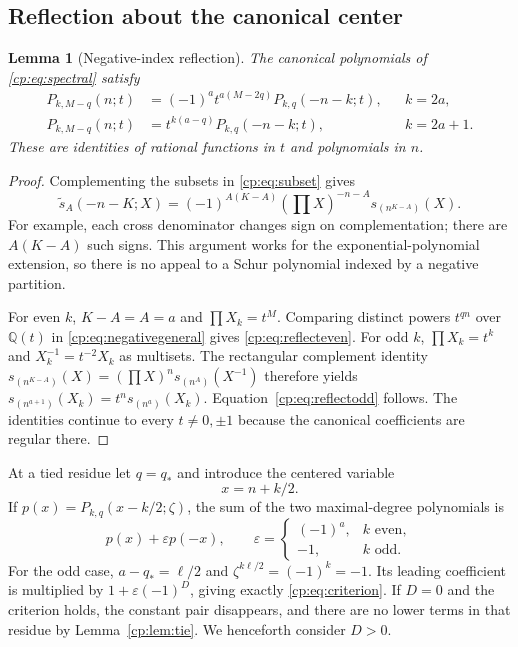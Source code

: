 \documentclass[11pt]{article}
\newtheorem{lemma}[theorem]{Lemma}
\theoremstyle{definition}
\theoremstyle{remark}
\newcommand{\Q}{\mathbb Q}
\theoremstyle{definition}
\theoremstyle{plain}
\numberwithin{equation}{section}
\begin{document}
\subsection{Reflection about the canonical center}
\begin{lemma}[Negative-index reflection]
\label{cp:lem:reflection}
The canonical polynomials of \eqref{cp:eq:spectral} satisfy
\begin{align}
 P_{k,M-q}(n;t)&=(-1)^a t^{a(M-2q)}P_{k,q}(-n-k;t),&&k=2a,
 \label{cp:eq:reflecteven}\\
 P_{k,M-q}(n;t)&=t^{k(a-q)}P_{k,q}(-n-k;t),&&k=2a+1.
 \label{cp:eq:reflectodd}
\end{align}
These are identities of rational functions in $t$ and polynomials in $n$.
\end{lemma}
\begin{proof}
Complementing the subsets in \eqref{cp:eq:subset} gives
\begin{equation}
 \widetilde s_A(-n-K;X)=(-1)^{A(K-A)}
 (\prod X)^{-n-A}s_{(n^{K-A})}(X).
 \label{cp:eq:negativegeneral}
\end{equation}
For example, each cross denominator changes sign on complementation;
there are $A(K-A)$ such signs. This argument works for the
exponential-polynomial extension, so there is no appeal to a Schur
polynomial indexed by a negative partition.

For even $k$, $K-A=A=a$ and $\prod X_k=t^M$. Comparing distinct
powers $t^{qn}$ over $\Q(t)$ in \eqref{cp:eq:negativegeneral} gives
\eqref{cp:eq:reflecteven}. For odd $k$, $\prod X_k=t^k$ and
$X_k^{-1}=t^{-2}X_k$ as multisets. The rectangular complement identity
$s_{(n^{K-A})}(X)=(\prod X)^n s_{(n^A)}(X^{-1})$ therefore yields
$s_{(n^{a+1})}(X_k)=t^n s_{(n^a)}(X_k)$.
Equation~\eqref{cp:eq:reflectodd} follows. The identities continue to every
$t\ne0,\pm1$ because the canonical coefficients are regular there.
\end{proof}

At a tied residue let $q=q_*$ and introduce the centered variable
\begin{equation}x=n+k/2.\label{cp:eq:center}\end{equation}
If $p(x)=P_{k,q}(x-k/2;\zeta)$, the sum of the two maximal-degree
polynomials is
\begin{equation}
 p(x)+\varepsilon p(-x),\qquad
 \varepsilon=
 \begin{cases}(-1)^a,&k\text{ even},\\-1,&k\text{ odd}.
 \end{cases}
 \label{cp:eq:paritypair}
\end{equation}
For the odd case, $a-q_*=\ell/2$ and
$\zeta^{k\ell/2}=(-1)^k=-1$. Its leading coefficient is multiplied by
$1+\varepsilon(-1)^D$, giving exactly \eqref{cp:eq:criterion}.
If $D=0$ and the criterion holds, the constant pair disappears, and there
are no lower terms in that residue by Lemma~\ref{cp:lem:tie}. We henceforth
consider $D>0$.
\end{document}
